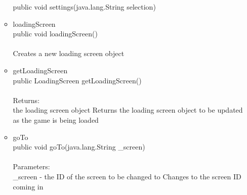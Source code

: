 \documentclass[letterpaper]{article}
\begin{document}
\begin{itemize}
\begin{itemize}
													public void settings(java.lang.String selection)
											\item	loadingScreen \\
													public void loadingScreen() \\ \\
													Creates a new loading screen object
											\item	getLoadingScreen \\
													public LoadingScreen getLoadingScreen() \\ \\
													Returns: \\
													the loading screen object Returns the loading screen object to be updated as the game is being loaded
											\item	goTo \\
													public void goTo(java.lang.String \_screen) \\ \\
													Parameters: \\
													\_screen - the ID of the screen to be changed to Changes to the screen ID coming in
										\end{itemize}
							\end{itemize}
							
\end{document}
